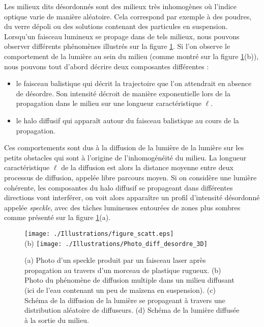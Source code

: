 \documentclass[a4paper,11pt]{article} %
\begin{document}
	Les milieux dits désordonnés sont des milieux très inhomogènes où l'indice optique varie de manière aléatoire. Cela correspond par exemple à des poudres, du verre dépoli ou des solutions contenant des particules en suspension. Lorsqu'un faisceau lumineux se propage dans de tels milieux, nous pouvons observer différents phénomènes illustrés sur la figure \ref{fig:diffusion_desordre_3D}. Si l'on observe le comportement de la lumière au sein du milieu (comme montré sur la figure \ref{fig:diffusion_desordre_3D}(b)), nous pouvons tout d'abord décrire deux  composantes différentes :
	\begin{itemize}
		\item le faisceau balistique qui décrit la trajectoire que l'on attendrait en absence de désordre. Son intensité décroit de manière exponentielle lors de la propagation dans le milieu sur une longueur caractéristique $\ell$.
		\item le halo diffusif qui apparaît autour du faisceau balistique au cours de la propagation.
	\end{itemize}
	Ces comportements sont dus à la diffusion de la lumière de la lumière sur les petits obstacles qui sont à l'origine de l'inhomogénéité du milieu. La longueur caractéristique $\ell$ de la diffusion est alors la distance moyenne entre deux processus de diffusion, appelée libre parcours moyen. Si on considère une lumière cohérente, les composantes du halo diffusif se propageant dans différentes directions vont interférer, on voit alors apparaître un profil d'intensité désordonné appelée \textit{speckle}, avec des tâches lumineuses entourées de zones plus sombres comme présenté sur la figure \ref{fig:diffusion_desordre_3D}(a).\\
	
	\begin{figure}[h]
		\centering
		\begin{minipage}[c]{0.85\linewidth}
			\centering
			\texttt{[image: ./Illustrations/figure\_scatt.eps]} \\
			(b) \hspace{0.1cm} \texttt{[image: ./Illustrations/Photo\_diff\_desordre\_3D]}
			\caption{(a) Photo d'un speckle produit par un faisceau laser après propagation au travers d'un morceau de plastique rugueux. (b) Photo du phénomène de diffusion multiple dans un milieu diffusant (ici de l'eau contenant un peu de maïzena en suspension). (c) Schéma de la diffusion de la lumière se propageant à travers une distribution aléatoire de diffuseurs. (d) Schéma de la lumière diffusée à la sortie du milieu.}
			\label{fig:diffusion_desordre_3D}
		\end{minipage}
	\end{figure}	
	
\end{document}
